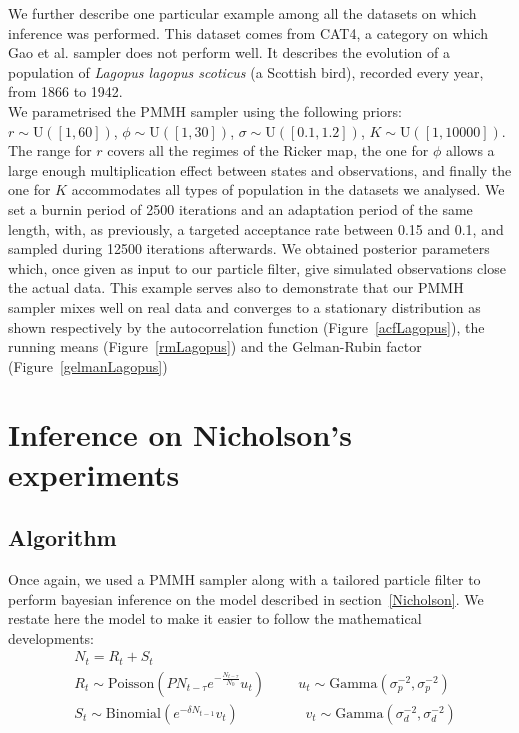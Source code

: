 \documentclass[12pt]{article}
\begin{document}
	We further describe one particular example among all the datasets on which inference was performed. This dataset comes from CAT4, a category on which Gao et al. sampler does not perform well. It describes the evolution of a population of \emph{Lagopus lagopus scoticus} (a Scottish bird), recorded every year, from 1866 to 1942. \\
	We parametrised the PMMH sampler using the following priors: $r \sim \mathrm{U}([1, 60])$, $\phi \sim \mathrm{U}([1, 30])$, $\sigma \sim \mathrm{U}([0.1, 1.2])$, $K \sim \mathrm{U}([1, 10000])$. The range for $r$ covers all the regimes of the Ricker map, the one for $\phi$ allows a large enough multiplication effect between states and observations, and finally the one for $K$ accommodates all types of population in the datasets we analysed. We set a burnin period of 2500 iterations and an adaptation period of the same length, with, as previously, a targeted acceptance rate between 0.15 and 0.1, and sampled during 12500 iterations afterwards. We obtained posterior parameters which, once given as input to our particle filter, give simulated observations close the actual data. This example serves also to demonstrate that our PMMH sampler mixes well on real data and converges to a stationary distribution as shown respectively by the autocorrelation function (Figure~\ref{acfLagopus}), the running means (Figure~\ref{rmLagopus}) and the Gelman-Rubin factor (Figure~\ref{gelmanLagopus})
	
	\section{Inference on Nicholson's experiments} \label{infNicholson}
	\subsection{Algorithm}
		Once again, we used a PMMH sampler along with a tailored particle filter to perform bayesian inference on the model described in section~\ref{Nicholson}. We restate here the model to make it easier to follow the mathematical developments:
		\begin{align*}
		& N_t = R_t + S_t \\
		& R_t \sim  \mathrm{Poisson}(PN_{t-\tau}e^{-\frac{N_{t-\tau}}{N_0}}u_t)  \hspace{1cm} u_t \sim \mathrm{Gamma}(\sigma_p^{-2}, \sigma_p^{-2})\\ 
		& S_t \sim \mathrm{Binomial}(e^{-\delta N_{t-1}}v_t) \hspace{2cm}  v_t \sim \mathrm{Gamma}(\sigma_d^{-2}, \sigma_d^{-2}) 
		\end{align*}
\end{document}
